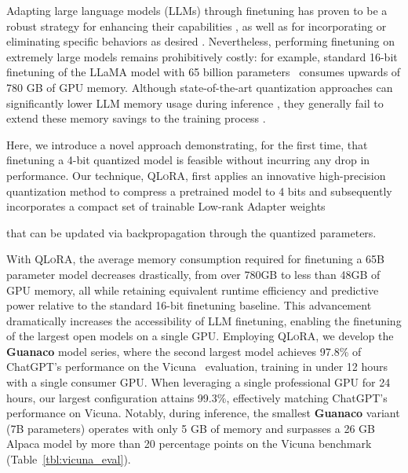 Adapting large language models (LLMs) through finetuning has proven to be a robust strategy for enhancing their capabilities \citep{min2021metaicl, wei2021finetuned, ouyang2022training, wang2022super, wang2022self, liu2022few}, as well as for incorporating or eliminating specific behaviors as desired \citep{ouyang2022training,askell2021general,bai2022training}. Nevertheless, performing finetuning on extremely large models remains prohibitively costly: for example, standard 16-bit finetuning of the LLaMA model with 65 billion parameters~\citep{touvron2023llama} consumes upwards of 780 GB of GPU memory. Although state-of-the-art quantization approaches can significantly lower LLM memory usage during inference \citep{dettmers2022llm, dettmers2022case, frantar2022gptq, xiao2022smoothquant}, they generally fail to extend these memory savings to the training process \citep{wortsman2023stable}.

Here, we introduce a novel approach demonstrating, for the first time, that finetuning a 4-bit quantized model is feasible without incurring any drop in performance. Our technique, \textsc{QLoRA}, first applies an innovative high-precision quantization method to compress a pretrained model to 4 bits and subsequently incorporates a compact set of trainable Low-rank Adapter weights \citep{hu2021lora} 

that can be updated via backpropagation through the quantized parameters.

With \textsc{QLoRA}, the average memory consumption required for finetuning a 65B parameter model decreases drastically, from over 780GB to less than 48GB of GPU memory, all while retaining equivalent runtime efficiency and predictive power relative to the standard 16-bit finetuning baseline. This advancement dramatically increases the accessibility of LLM finetuning, enabling the finetuning of the largest open models on a single GPU. Employing \textsc{QLoRA}, we develop the \textbf{Guanaco} model series, where the second largest model achieves 97.8\% of ChatGPT's performance on the Vicuna~\citep{vicuna2023} evaluation, training in under 12 hours with a single consumer GPU. When leveraging a single professional GPU for 24 hours, our largest configuration attains 99.3\%, effectively matching ChatGPT’s performance on Vicuna. Notably, during inference, the smallest \textbf{Guanaco} variant (7B parameters) operates with only 5 GB of memory and surpasses a 26 GB Alpaca model by more than 20 percentage points on the Vicuna benchmark (Table~\ref{tbl:vicuna_eval}).

